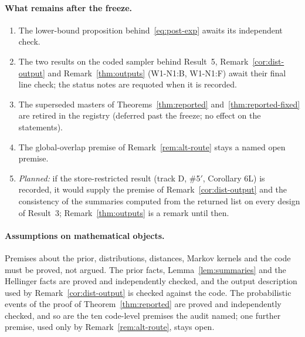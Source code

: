 \paragraph{What remains after the freeze.}
\begin{enumerate}[leftmargin=1.5em,itemsep=1pt]
  \item The lower-bound proposition behind~\eqref{eq:post-exp} awaits its independent check.
  \item The two results on the coded sampler behind Result~5, Remark~\ref{cor:dist-output} and Remark~\ref{thm:outputs}
    (W1-N1:B, W1-N1:F) await their final line check; the status notes are requoted when it is recorded.
  \item The superseded masters of Theorems~\ref{thm:reported} and~\ref{thm:reported-fixed} are retired in the registry
    (deferred past the freeze; no effect on the statements).
  \item The global-overlap premise of Remark~\ref{rem:alt-route} stays a named open premise.
  \item \emph{Planned:} if the store-restricted result (track D, \#5$'$, Corollary 6L) is recorded, it would supply the
    premise of Remark~\ref{cor:dist-output} and the consistency of the summaries computed from the returned list on
    every design of Result~3; Remark~\ref{thm:outputs} is a remark until then.
\end{enumerate}

\paragraph{Assumptions on mathematical objects.} Premises about the prior, distributions, distances, Markov kernels and
the code must be proved, not argued. The prior facts, Lemma~\ref{lem:summaries} and the Hellinger facts are proved and
independently checked, and the output description used by Remark~\ref{cor:dist-output} is checked against the code.
The probabilistic events of the proof of Theorem~\ref{thm:reported} are proved and independently checked, and so are the
ten code-level premises the audit named; one further premise, used only by Remark~\ref{rem:alt-route}, stays open.

